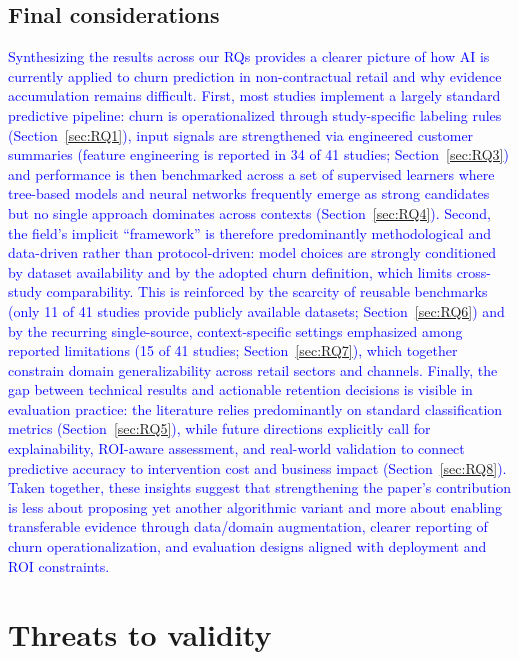 \documentclass[preprint,12pt]{elsarticle}
\begin{document}
\subsection{Final considerations}\nopagebreak
\noindent
\textcolor{blue}{Synthesizing the results across our RQs provides a clearer picture of how AI is currently applied to churn prediction in non-contractual retail and why evidence accumulation remains difficult. First, most studies implement a largely standard predictive pipeline: churn is operationalized through study-specific labeling rules (Section~\ref{sec:RQ1}), input signals are strengthened via engineered customer summaries (feature engineering is reported in 34 of 41 studies; Section~\ref{sec:RQ3}) and performance is then benchmarked across a set of supervised learners where tree-based models and neural networks frequently emerge as strong candidates but no single approach dominates across contexts (Section~\ref{sec:RQ4}). Second, the field’s implicit ``framework'' is therefore predominantly methodological and data-driven rather than protocol-driven: model choices are strongly conditioned by dataset availability and by the adopted churn definition, which limits cross-study comparability. This is reinforced by the scarcity of reusable benchmarks (only 11 of 41 studies provide publicly available datasets; Section~\ref{sec:RQ6}) and by the recurring single-source, context-specific settings emphasized among reported limitations (15 of 41 studies; Section~\ref{sec:RQ7}), which together constrain domain generalizability across retail sectors and channels. Finally, the gap between technical results and actionable retention decisions is visible in evaluation practice: the literature relies predominantly on standard classification metrics (Section~\ref{sec:RQ5}), while future directions explicitly call for explainability, ROI-aware assessment, and real-world validation to connect predictive accuracy to intervention cost and business impact (Section~\ref{sec:RQ8}). Taken together, these insights suggest that strengthening the paper’s contribution is less about proposing yet another algorithmic variant and more about enabling transferable evidence through data/domain augmentation, clearer reporting of churn operationalization, and evaluation designs aligned with deployment and ROI constraints.}

\section{Threats to validity}
\label{sec:threats-to-validity}
\end{document}
